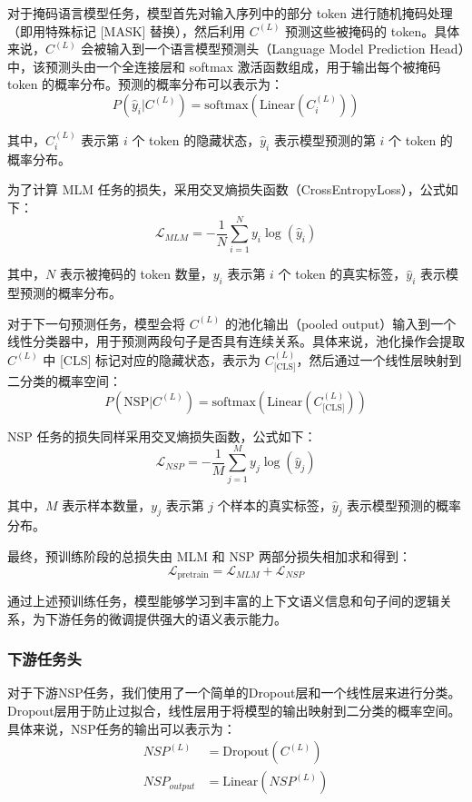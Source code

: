 \documentclass[12pt, a4paper]{ctexart}
\begin{document}
对于掩码语言模型任务，模型首先对输入序列中的部分 token 进行随机掩码处理（即用特殊标记 [MASK] 替换），然后利用 $C^{(L)}$ 预测这些被掩码的 token。具体来说，$C^{(L)}$ 会被输入到一个语言模型预测头（Language Model Prediction Head）中，该预测头由一个全连接层和 softmax 激活函数组成，用于输出每个被掩码 token 的概率分布。预测的概率分布可以表示为：
\begin{equation}
    P(\hat{y}_i | C^{(L)}) = \text{softmax}(\text{Linear}(C^{(L)}_i))
\end{equation}

其中，$C^{(L)}_i$ 表示第 $i$ 个 token 的隐藏状态，$\hat{y}_i$ 表示模型预测的第 $i$ 个 token 的概率分布。

为了计算 MLM 任务的损失，采用交叉熵损失函数（CrossEntropyLoss），公式如下：
\begin{equation}
    \mathcal{L}_{MLM} = -\frac{1}{N} \sum_{i=1}^{N} y_i \log(\hat{y}_i)
\end{equation}

其中，$N$ 表示被掩码的 token 数量，$y_i$ 表示第 $i$ 个 token 的真实标签，$\hat{y}_i$ 表示模型预测的概率分布。


对于下一句预测任务，模型会将 $C^{(L)}$ 的池化输出（pooled output）输入到一个线性分类器中，用于预测两段句子是否具有连续关系。具体来说，池化操作会提取 $C^{(L)}$ 中 [CLS] 标记对应的隐藏状态，表示为 $C^{(L)}_{\text{[CLS]}}$，然后通过一个线性层映射到二分类的概率空间：
\begin{equation}
    P(\text{NSP} | C^{(L)}) = \text{softmax}(\text{Linear}(C^{(L)}_{\text{[CLS]}}))
\end{equation}

NSP 任务的损失同样采用交叉熵损失函数，公式如下：
\begin{equation}
    \mathcal{L}_{NSP} = -\frac{1}{M} \sum_{j=1}^{M} y_j \log(\hat{y}_j)
\end{equation}

其中，$M$ 表示样本数量，$y_j$ 表示第 $j$ 个样本的真实标签，$\hat{y}_j$ 表示模型预测的概率分布。

最终，预训练阶段的总损失由 MLM 和 NSP 两部分损失相加求和得到：
\begin{equation}
    \mathcal{L}_{\text{pretrain}} = \mathcal{L}_{MLM} + \mathcal{L}_{NSP}
\end{equation}

通过上述预训练任务，模型能够学习到丰富的上下文语义信息和句子间的逻辑关系，为下游任务的微调提供强大的语义表示能力。

\subsubsection{下游任务头}
对于下游NSP任务，我们使用了一个简单的Dropout层和一个线性层来进行分类。Dropout层用于防止过拟合，线性层用于将模型的输出映射到二分类的概率空间。具体来说，NSP任务的输出可以表示为：
\begin{equation}
    \begin{split}
        NSP^{(L)} &= \text{Dropout}(C^{(L)}) \\
        NSP_{output} &= \text{Linear}(NSP^{(L)}) \\
    \end{split}
\end{equation}
\end{document}
